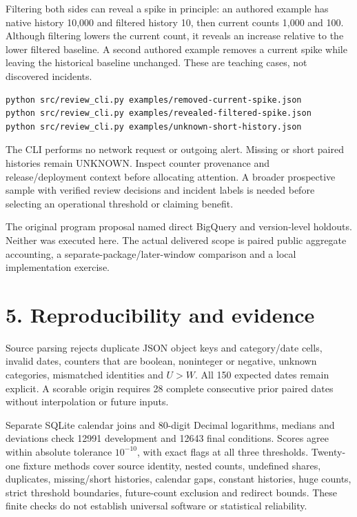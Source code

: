 \documentclass[11pt]{article}
\newcommand{\MDevChecks}{12991}
\newcommand{\MFinalChecks}{12643}
\begin{document}
Filtering both sides can reveal a spike in principle: an authored example has native history 10,000 and filtered history 10, then current counts 1,000 and 100. Although filtering lowers the current count, it reveals an increase relative to the lower filtered baseline. A second authored example removes a current spike while leaving the historical baseline unchanged. These are teaching cases, not discovered incidents.

\begin{verbatim}
python src/review_cli.py examples/removed-current-spike.json
python src/review_cli.py examples/revealed-filtered-spike.json
python src/review_cli.py examples/unknown-short-history.json
\end{verbatim}
The CLI performs no network request or outgoing alert. Missing or short paired histories remain UNKNOWN. Inspect counter provenance and release/deployment context before allocating attention. A broader prospective sample with verified review decisions and incident labels is needed before selecting an operational threshold or claiming benefit.

The original program proposal named direct BigQuery and version-level holdouts. Neither was executed here. The actual delivered scope is paired public aggregate accounting, a separate-package/later-window comparison and a local implementation exercise.
\newpage
\section*{5. Reproducibility and evidence}
Source parsing rejects duplicate JSON object keys and category/date cells, invalid dates, counters that are boolean, noninteger or negative, unknown categories, mismatched identities and $U>W$. All 150 expected dates remain explicit. A scorable origin requires 28 complete consecutive prior paired dates without interpolation or future inputs.

Separate SQLite calendar joins and 80-digit Decimal logarithms, medians and deviations check \MDevChecks{} development and \MFinalChecks{} final conditions. Scores agree within absolute tolerance $10^{-10}$, with exact flags at all three thresholds. Twenty-one fixture methods cover source identity, nested counts, undefined shares, duplicates, missing/short histories, calendar gaps, constant histories, huge counts, strict threshold boundaries, future-count exclusion and redirect bounds. These finite checks do not establish universal software or statistical reliability.
\end{document}
